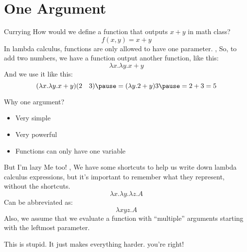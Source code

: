 \section{One Argument}
\begin{namedframe}{Currying}
	How would we define a function that outputs $x + y$ in math class?
	\pause
	\[f(x, y) = x + y\]
	\pause
	In lambda calculus, functions are only allowed to have \alert{one} parameter.
	\sep
	So, to add two numbers, we have a function output another function, like this:
	\[\lambda x . \lambda y . x + y\]
	And we use it like this:
	\[(\lambda x . \lambda y . x + y) (2 \quad 3) \pause = (\lambda y . 2 + y) 3 \pause = 2 + 3 = 5\]
\end{namedframe}
\begin{namedframe}{Why one argument?}
	\begin{itemize}[<+->]
		\item Very simple
		\item Very powerful
		\item Functions can only have one variable
	\end{itemize}
\end{namedframe}
\begin{namedframe}{But I'm lazy}
	Me too!
	\sep
	We have some shortcuts to help us write down lambda calculus expressions, but it's important to remember what they represent, without the shortcuts.
	\pause
	\[\lambda x . \lambda y . \lambda z . A\]
	Can be abbreviated as:
	\[\lambda xyz . A\]
	\pause
	Also, we assume that we evaluate a function with ``multiple'' arguments starting with the leftmost parameter.
\end{namedframe}
\begin{namedframe}{This is stupid. It just makes everything harder.}
	you're right!

\end{namedframe}
